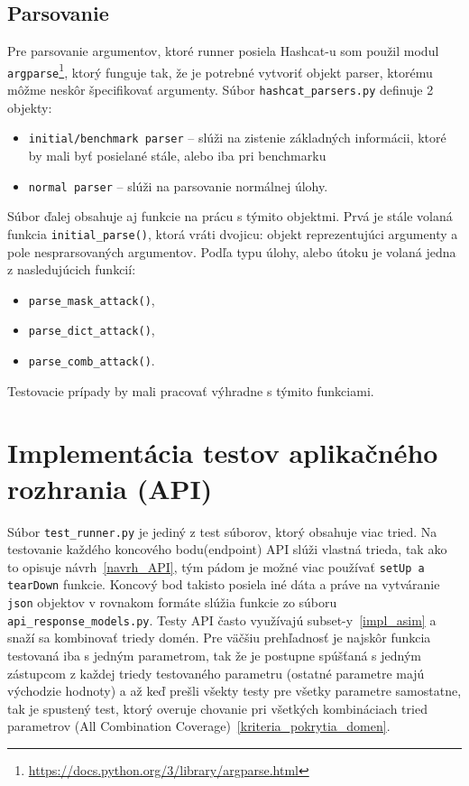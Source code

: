 \subsection*{Parsovanie}
\label{parsing}
Pre parsovanie argumentov, ktoré runner posiela Hashcat-u som použil modul \texttt{argparse}\footnote{\url{https://docs.python.org/3/library/argparse.html}}, ktorý funguje tak, že je potrebné vytvoriť objekt parser, ktorému môžme neskôr špecifikovať argumenty.
Súbor \texttt{hashcat\_parsers.py} definuje 2 objekty:
\begin{itemize}
	\item \texttt{initial/benchmark parser} -- slúži na zistenie základných informácii, ktoré by mali byť posielané stále, alebo iba pri benchmarku
	\item \texttt{normal parser} -- slúži na parsovanie normálnej úlohy.
\end{itemize}
Súbor ďalej obsahuje aj funkcie na prácu s týmito objektmi.
Prvá je stále volaná funkcia \texttt{initial\_parse()}, ktorá vráti dvojicu: objekt reprezentujúci argumenty a pole nesprarsovaných argumentov.
Podľa typu úlohy, alebo útoku je volaná jedna z nasledujúcich funkcií:
\begin{itemize}
	\item \texttt{parse\_mask\_attack()},
	\item \texttt{parse\_dict\_attack()},
	\item \texttt{parse\_comb\_attack()}.
\end{itemize}
Testovacie prípady by mali pracovať výhradne s týmito funkciami.

\section{Implementácia testov aplikačného rozhrania (API)}
\label{impl_API}
Súbor \texttt{test\_runner.py} je jediný z test súborov, ktorý obsahuje viac tried.
Na testovanie každého koncového bodu(endpoint) API slúži vlastná trieda, tak ako to opisuje návrh~\ref{navrh_API}, tým pádom je možné viac používať \texttt{setUp a tearDown} funkcie.
Koncový bod takisto posiela iné dáta a práve na vytváranie \texttt{json} objektov v rovnakom formáte slúžia funkcie zo súboru \texttt{api\_response\_models.py}.
Testy API často využívajú subset-y~\ref{impl_asim} a snaží sa kombinovať triedy domén. 
Pre väčšiu prehľadnosť je najskôr funkcia testovaná iba s jedným parametrom, tak že je postupne spúšťaná s jedným zástupcom z každej triedy testovaného parametru (ostatné parametre majú východzie hodnoty) a až keď prešli všekty testy pre všetky parametre samostatne, tak je spustený test, ktorý overuje chovanie pri všetkých kombináciach tried parametrov (All Combination Coverage)~\ref{kriteria_pokrytia_domen}.
